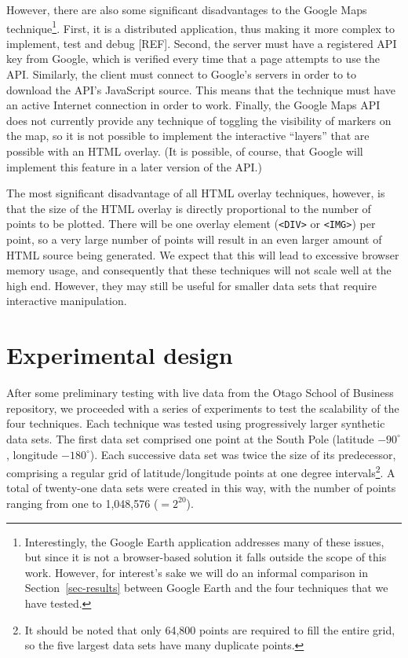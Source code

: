 \documentclass[acmtocl,acmnow]{acmtrans2m}
\begin{document}
However, there are also some significant disadvantages to the Google
Maps technique\footnote{Interestingly, the Google Earth application
addresses many of these issues, but since it is not a browser-based
solution it falls outside the scope of this work. However, for
interest's sake we will do an informal comparison in
Section~\ref{sec-results} between Google Earth and the four techniques
that we have tested.}. First, it is a distributed application, thus
making it more complex to implement, test and debug [REF]. Second, the
server must have a registered API key from Google, which is verified
every time that a page attempts to use the API. Similarly, the client
must connect to Google's servers in order to to download the API's
JavaScript source. This means that the technique must have an active
Internet connection in order to work. Finally, the Google Maps API does
not currently provide any technique of toggling the visibility of
markers on the map, so it is not possible to implement the interactive
``layers'' that are possible with an HTML overlay. (It is possible, of
course, that Google will implement this feature in a later version of
the API.)

The most significant disadvantage of all HTML overlay techniques,
however, is that the size of the HTML overlay is directly proportional
to the number of points to be plotted. There will be one overlay element
(\verb|<DIV>| or \verb|<IMG>|) per point, so a very large number of
points will result in an even larger amount of HTML source being
generated. We expect that this will lead to excessive browser memory
usage, and consequently that these techniques will not scale well at the
high end. However, they may still be useful for smaller data sets that
require interactive manipulation.


\section{Experimental design}
\label{sec-experiment}

After some preliminary testing with live data from the Otago School of
Business repository, we proceeded with a series of experiments to test
the scalability of the four techniques. Each technique was tested using
progressively larger synthetic data sets. The first data set comprised
one point at the South Pole (latitude \(-90^{\circ}\), longitude
\(-180^{\circ}\)). Each successive data set was twice the size of its
predecessor, comprising a regular grid of latitude/longitude points at
one degree intervals\footnote{It should be noted that only 64,800 points are
required to fill the entire grid, so the five largest data sets have
many duplicate points.}. A total of twenty-one data sets were created in
this way, with the number of points ranging from one to 1,048,576
(\(=2^{20}\)).
\end{document}
